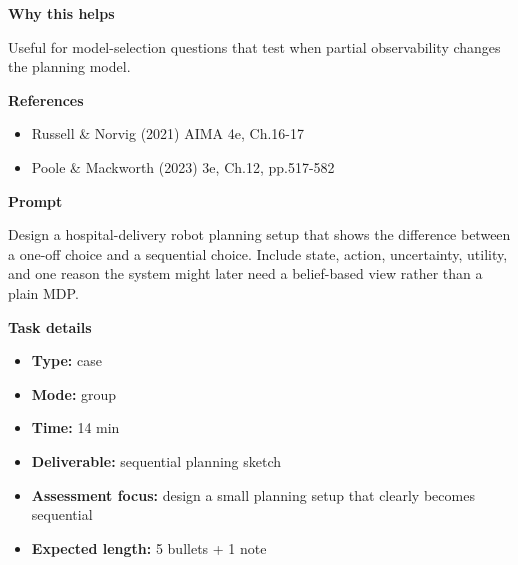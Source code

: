 \documentclass[11pt]{article}
\begin{document}
\begin{tcolorbox}[colback=white,colframe=MidnightBlue,title={Q3 Structured Problem},fonttitle=\bfseries,breakable]
{\large\bfseries\color{MidnightBlue} Why this helps}\par\medskip
Useful for model-selection questions that test when partial observability changes the planning model.

{\large\bfseries\color{MidnightBlue} References}\par\medskip
\begin{itemize}\item Russell \& Norvig (2021) AIMA 4e, Ch.16-17
\item Poole \& Mackworth (2023) 3e, Ch.12, pp.517-582\end{itemize}
\end{tcolorbox}

\begin{tcolorbox}[colback=white,colframe=MidnightBlue,title={Q4 Collaborative Mini-Case},fonttitle=\bfseries,breakable]
\begin{center}
\end{center}

{\large\bfseries\color{MidnightBlue} Prompt}\par\medskip
Design a hospital-delivery robot planning setup that shows the difference between a one-off choice and a sequential choice. Include state, action, uncertainty, utility, and one reason the system might later need a belief-based view rather than a plain MDP.

{\large\bfseries\color{MidnightBlue} Task details}\par\medskip
\begin{itemize}\item \textbf{Type:} case
\item \textbf{Mode:} group
\item \textbf{Time:} 14 min
\item \textbf{Deliverable:} sequential planning sketch
\item \textbf{Assessment focus:} design a small planning setup that clearly becomes sequential
\item \textbf{Expected length:} 5 bullets + 1 note\end{itemize}


\end{tcolorbox}
\end{document}
